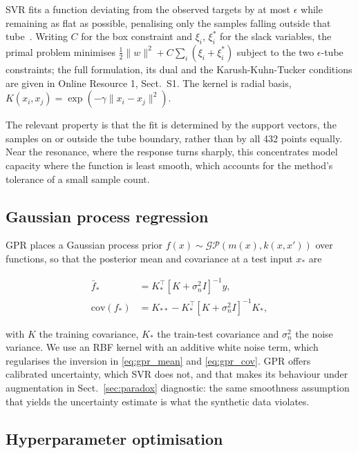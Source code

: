 \documentclass[iicol,pdflatex,sn-basic,Numbered]{sn-jnl}
\begin{document}
SVR fits a function deviating from the observed targets by at most $\epsilon$
while remaining as flat as possible, penalising only the samples falling outside
that tube~\cite{smola2004}. Writing $C$ for the box constraint and $\xi_i$,
$\xi_i^{*}$ for the slack variables, the primal problem minimises
$\tfrac{1}{2}\|w\|^{2} + C\sum_{i}(\xi_i + \xi_i^{*})$ subject to the two
$\epsilon$-tube constraints; the full formulation, its dual and the
Karush-Kuhn-Tucker conditions are given in Online Resource 1, Sect.~S1. The
kernel is radial basis,
$K(x_i,x_j) = \exp(-\gamma\|x_i - x_j\|^{2})$.

The relevant property is that the fit is determined by the support vectors, the
samples on or outside the tube boundary, rather than by all 432 points equally.
Near the resonance, where the response turns sharply, this concentrates model
capacity where the function is least smooth, which accounts for the method's
tolerance of a small sample count.

\subsection{Gaussian process regression}\label{sec:gpr}

GPR places a Gaussian process prior $f(x)\sim\mathcal{GP}(m(x),k(x,x'))$ over
functions, so that the posterior mean and covariance at a test input $x_*$
are~\cite{rasmussen2006}

\begin{align}
\bar{f}_* &= K_*^{\top}\left[K + \sigma_n^{2}I\right]^{-1}y,
\label{eq:gpr_mean}\\
\mathrm{cov}(f_*) &= K_{**} - K_*^{\top}\left[K + \sigma_n^{2}I\right]^{-1}K_*,
\label{eq:gpr_cov}
\end{align}

with $K$ the training covariance, $K_*$ the train-test covariance and
$\sigma_n^{2}$ the noise variance. We use an RBF kernel with an additive white
noise term, which regularises the inversion in \eqref{eq:gpr_mean} and
\eqref{eq:gpr_cov}. GPR offers calibrated uncertainty, which SVR does not, and
that makes its behaviour under augmentation in Sect.~\ref{sec:paradox}
diagnostic: the same smoothness assumption that yields the uncertainty estimate
is what the synthetic data violates.

\subsection{Hyperparameter optimisation}\label{sec:bayesopt}
\end{document}
